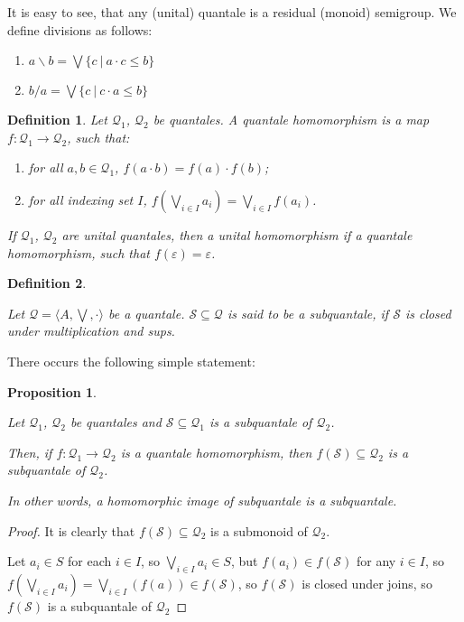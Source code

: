 \documentclass[a4paper]{article}
\theoremstyle{defin}
\newtheorem{defin}{Definition}
\theoremstyle{theorem}
\theoremstyle{prop}
\newtheorem{prop}{Proposition}
\theoremstyle{lemma}
\theoremstyle{ex}
\theoremstyle{col}
\begin{document}
It is easy to see, that any (unital) quantale is a residual (monoid) semigroup. We define divisions as follows:

\begin{enumerate}
\item $a \backslash b = \bigvee \{ c \: | \: a \cdot c \leq b \}$
\item $b / a = \bigvee \{ c \: | \: c \cdot a \leq b \}$
\end{enumerate}

\begin{defin}

  Let $\mathcal{Q}_1$, $\mathcal{Q}_2$ be quantales. A quantale homomorphism is a map $f : \mathcal{Q}_1 \to \mathcal{Q}_2$, such that:

  \begin{enumerate}
    \item for all $a,b \in \mathcal{Q}_1$, $f(a \cdot b) = f(a) \cdot f(b)$;
    \item for all indexing set $I$, $f(\bigvee \limits_{i \in I} a_i) = \bigvee \limits_{i \in I} f(a_i)$.
  \end{enumerate}

  If $\mathcal{Q}_1$, $\mathcal{Q}_2$ are unital quantales, then a unital homomorphism if a quantale homomorphism, such that $f(\varepsilon) = \varepsilon$.
\end{defin}

\begin{defin}
$ $

  Let $\mathcal{Q} = \langle A, \bigvee, \cdot \rangle$ be a quantale. $\mathcal{S} \subseteq \mathcal{Q}$ is said to be a subquantale, if
  $\mathcal{S}$ is closed under multiplication and sups.
\end{defin}

There occurs the following simple statement:

\begin{prop}
  $ $

Let $\mathcal{Q}_1$, $\mathcal{Q}_2$ be quantales and $\mathcal{S} \subseteq \mathcal{Q}_1$ is a subquantale of $\mathcal{Q}_2$.

Then, if $f : \mathcal{Q}_1 \to \mathcal{Q}_2$ is a quantale homomorphism, then $f(\mathcal{S}) \subseteq \mathcal{Q}_2$ is a subquantale of $\mathcal{Q}_2$.

In other words, a homomorphic image of subquantale is a subquantale.
\end{prop}

\begin{proof}
  It is clearly that $f(\mathcal{S}) \subseteq \mathcal{Q}_2$ is a submonoid of $\mathcal{Q}_2$.

  Let $a_i \in S$ for each $i \in I$, so $\bigvee \limits_{i \in I} a_i \in S$, but $f(a_i) \in f(\mathcal{S})$ for any $i \in I$,
  so $f(\bigvee \limits_{i \in I} a_i) = \bigvee \limits_{i \in I} (f (a)) \in f(\mathcal{S})$, so $f(\mathcal{S})$ is closed under joins, so $f(\mathcal{S})$ is a subquantale of $\mathcal{Q}_2$
\end{proof}
\end{document}
